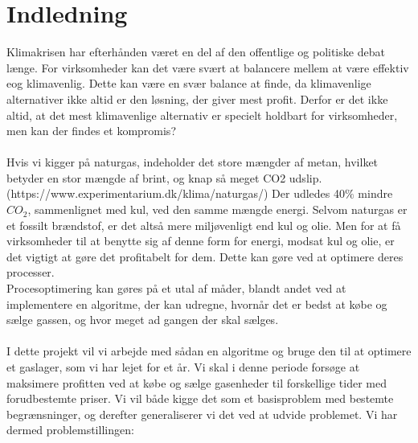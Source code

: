\chapter{Indledning}
Klimakrisen har efterhånden været en del af den offentlige og politiske debat længe. For virksomheder kan det være svært at balancere mellem at være effektiv eog klimavenlig. Dette kan være en svær balance at finde, da klimavenlige alternativer ikke altid er den løsning, der giver mest profit. Derfor er det ikke altid, at det mest klimavenlige alternativ er specielt holdbart for virksomheder, men kan der findes et kompromis? \\ \\Hvis vi kigger på naturgas, indeholder det store mængder af metan, hvilket betyder en stor mængde af brint, og knap så meget CO2 udslip. (https://www.experimentarium.dk/klima/naturgas/) Der udledes 40$\%$ mindre $CO_{2}$, sammenlignet med kul, ved den samme mængde energi. Selvom naturgas er et fossilt brændstof, er det altså mere miljøvenligt end kul og olie. Men for at få virksomheder til at benytte sig af denne form for energi, modsat kul og olie, er det vigtigt at gøre det profitabelt for dem. Dette kan gøre ved at optimere deres processer. \\ Procesoptimering kan gøres på et utal af måder, blandt andet ved at implementere en algoritme, der kan udregne, hvornår det er bedst at købe og sælge gassen, og hvor meget ad gangen der skal sælges. \\
\\I dette projekt vil vi arbejde med sådan en algoritme og bruge den til at optimere et gaslager, som vi har lejet for et år. Vi skal i denne periode forsøge at maksimere profitten ved at købe og sælge gasenheder til forskellige tider med forudbestemte priser. Vi vil både kigge det som et basisproblem med bestemte begrænsninger, og derefter generaliserer vi det ved at udvide problemet. Vi har dermed problemstillingen: 

